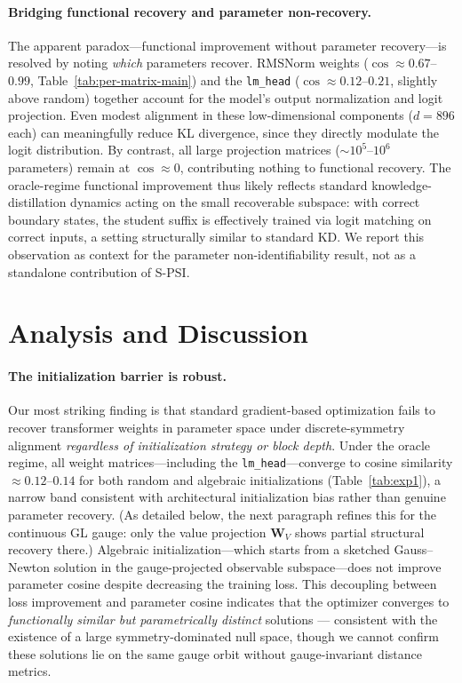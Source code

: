 \documentclass{article}
\newcommand{\bW}{\mathbf{W}}
\begin{document}
\paragraph{Bridging functional recovery and parameter non-recovery.}
The apparent paradox---functional improvement without parameter recovery---is resolved by noting \emph{which} parameters recover.  RMSNorm weights ($\cos \approx 0.67$--$0.99$, Table~\ref{tab:per-matrix-main}) and the \texttt{lm\_head} ($\cos \approx 0.12$--$0.21$, slightly above random) together account for the model's output normalization and logit projection.  Even modest alignment in these low-dimensional components ($d = 896$ each) can meaningfully reduce KL divergence, since they directly modulate the logit distribution.  By contrast, all large projection matrices ($\sim 10^5$--$10^6$ parameters) remain at $\cos \approx 0$, contributing nothing to functional recovery.  The oracle-regime functional improvement thus likely reflects standard knowledge-distillation dynamics acting on the small recoverable subspace: with correct boundary states, the student suffix is effectively trained via logit matching on correct inputs, a setting structurally similar to standard KD.  We report this observation as context for the parameter non-identifiability result, not as a standalone contribution of S-PSI.

\section{Analysis and Discussion}
\label{sec:analysis}

\paragraph{The initialization barrier is robust.}
Our most striking finding is that standard gradient-based optimization fails to recover transformer weights in parameter space under discrete-symmetry alignment \emph{regardless of initialization strategy or block depth}.  Under the oracle regime, all weight matrices---including the \texttt{lm\_head}---converge to cosine similarity $\approx 0.12$--$0.14$ for both random and algebraic initializations (Table~\ref{tab:exp1}), a narrow band consistent with architectural initialization bias rather than genuine parameter recovery.  (As detailed below, the next paragraph refines this for the continuous GL gauge: only the value projection $\bW_V$ shows partial structural recovery there.)  Algebraic initialization---which starts from a sketched Gauss--Newton solution in the gauge-projected observable subspace---does not improve parameter cosine despite decreasing the training loss.  This decoupling between loss improvement and parameter cosine indicates that the optimizer converges to \emph{functionally similar but parametrically distinct} solutions --- consistent with the existence of a large symmetry-dominated null space, though we cannot confirm these solutions lie on the same gauge orbit without gauge-invariant distance metrics.
\end{document}

